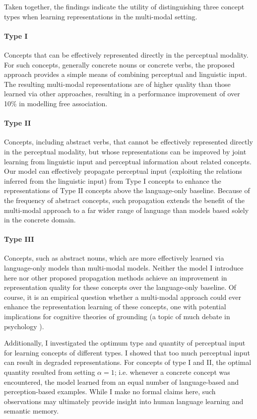 Taken together, the findings indicate the utility of distinguishing three concept types when learning representations in the multi-modal setting. 

\paragraph{Type I} Concepts that can be effectively represented directly in the perceptual modality. For such concepts, generally concrete nouns or concrete verbs, the proposed approach provides a simple means of combining perceptual and linguistic input. The resulting multi-modal representations are of higher quality than those learned via other approaches, resulting in a performance improvement of over 10\% in modelling free association.

\paragraph{Type II} Concepts, including abstract verbs, that cannot be effectively represented directly in the perceptual modality, but whose representations can be improved by joint learning from linguistic input and perceptual information about related concepts. Our model can effectively propagate perceptual input (exploiting the relations inferred from the linguistic input) from Type I concepts to enhance the representations of Type II concepts above the language-only baseline. Because of the frequency of abstract concepts, such propagation extends the benefit of the multi-modal approach to a far wider range of language than models based solely in the concrete domain. 

\paragraph{Type III} Concepts, such as abstract nouns, which are more effectively learned via language-only models than multi-modal models. Neither the model I introduce here nor other proposed propagation methods achieve an improvement in representation quality for these concepts over the language-only baseline. Of course, it is an empirical question whether a multi-modal approach could ever enhance the representation learning of these concepts, one with potential implications for cognitive theories of grounding (a topic of much debate in psychology \citep{grafton2009embodied,barsalou2010grounded}). 

Additionally, I investigated the optimum type and quantity of perceptual input for learning concepts of different types. I showed that too much perceptual input can result in degraded representations. For concepts of type I and II, the optimal quantity resulted from setting \(\alpha = 1\); i.e. whenever a concrete concept was encountered, the model learned from an equal number of language-based and perception-based examples. While I make no formal claims here, such observations may ultimately provide insight into human language learning and semantic memory. 

